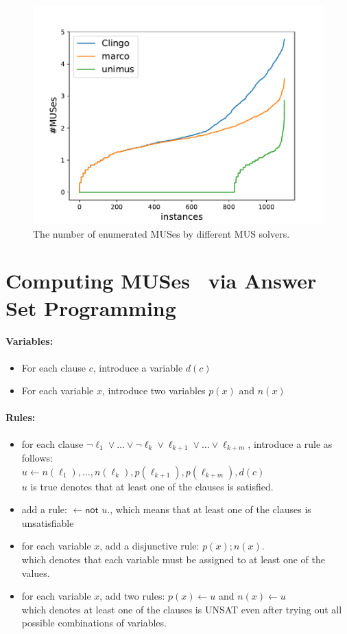 \documentclass{article}
\begin{document}
\begin{figure}
  \centering
  \includegraphics[scale=0.5]{images/countMUS.pdf}
  \caption{The number of enumerated MUSes by different MUS solvers.}
\end{figure}


\newpage
\section{Computing MUSes~\cite{LPMM2016} via Answer Set Programming}
\paragraph{Variables:}
\begin{itemize}
    \item For each clause $c$, introduce a variable $d(c)$
    \item For each variable $x$, introduce two variables $p(x)$ and $n(x)$
\end{itemize}
\paragraph{Rules:}
\begin{itemize}
    \item for each clause $\neg{\ell_1} \vee \ldots \vee 
    \neg{\ell_k} \vee \ell_{k+1} \vee \ldots \vee \ell_{k+m}$, 
    introduce a rule as follows:\\
    $u \leftarrow n(\ell_1), \ldots, n(\ell_k), p(\ell_{k+1}), p(\ell_{k+m}), d(c)$\\
    $u$ is true denotes that at least one of the clauses is satisfied.
    \item add a rule: $\leftarrow \textsf{not } u.$,
    which means that at least one of the clauses is unsatisfiable
    \item for each variable $x$, add a disjunctive rule: $p(x) ; n(x).$\\
    which denotes that each variable must be assigned to at least one of the values.
    \item for each variable $x$, add two rules: $p(x) \leftarrow u$ and $n(x) \leftarrow u$\\
    which denotes at least one of the clauses is UNSAT even after trying out all possible combinations of variables.
\end{itemize}
\end{document}
